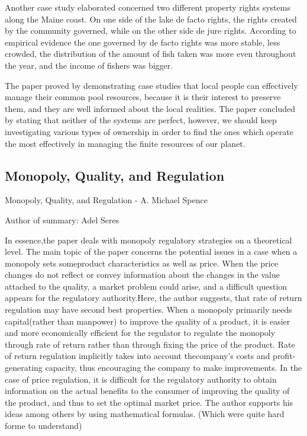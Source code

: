 \documentclass[12pt]{report}
\numberwithin{equation}{section}
\begin{document}
Another case study elaborated concerned two different property rights systems along the Maine coast. On one side of the lake de facto rights, the rights created by the community governed, while on  the  other side de jure rights.  According to  empirical evidence  the  one  governed  by  de  facto rights was more stable, less crowded, the distribution of the amount of fish taken was more even throughout the year, and the income of fishers was bigger. \par

The paper proved by demonstrating case studies that local people can effectively manage their common pool resources, because it is their interest to preserve them, and they are well informed about the local realities. The paper concluded by stating that neither of the systems are perfect, however, we should keep investigating various types of ownership in order to find the ones which operate the most effectively in managing the finite resources of our planet. 

\newpage

\subsection{Monopoly, Quality, and Regulation}

Monopoly, Quality, and Regulation - A. Michael Spence

Author of summary: Adel Seres

In essence,the paper deals with monopoly regulatory strategies on a theoretical level. The main topic of the paper concerns the potential issues in a case when a monopoly sets someproduct characteristics as well as price. When the price changes do not reflect or convey information about the changes in the value attached to the quality, a market problem could arise, and a difficult question appears for the regulatory authority.Here, the author suggests, that rate of return regulation may have second best properties. When a monopoly primarily needs capital(rather than manpower) to improve the quality of a product, it is easier and more economically efficient for the regulator to regulate the monopoly through rate of return rather than through fixing the price of the product. Rate of return regulation implicitly takes into account thecompany's costs and profit-generating capacity, thus encouraging the company to make improvements. In the case of price regulation, it is difficult for the regulatory authority to obtain information on the actual benefits to the consumer of improving the quality of the product, and thus to set the optimal market price. The author supports his ideas among others by using mathematical formulas. (Which were quite hard forme to understand)
\end{document}
